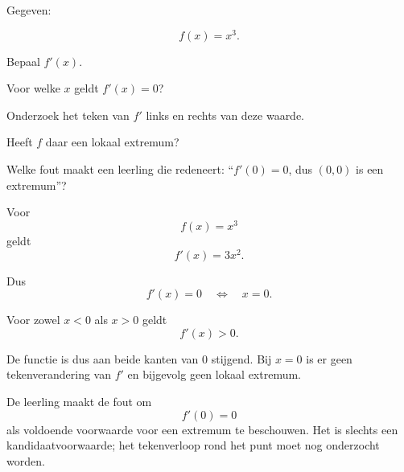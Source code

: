 \documentclass{ximera}
\begin{document}

\begin{oefening}[Geen extremum ondanks $f'(a)=0$]{\oefB\ESS}

Gegeven:

\[
f(x)=x^3.
\]

\begin{question}
Bepaal $f'(x)$.
\end{question}

\begin{question}
Voor welke $x$ geldt $f'(x)=0$?
\end{question}

\begin{question}
Onderzoek het teken van $f'$ links en rechts van deze waarde.
\end{question}

\begin{question}
Heeft $f$ daar een lokaal extremum?
\end{question}

\begin{question}
Welke fout maakt een leerling die redeneert:
``$f'(0)=0$, dus $(0,0)$ is een extremum''?
\end{question}

\begin{oplossing}

Voor
\[
f(x)=x^3
\]
geldt
\[
f'(x)=3x^2.
\]

Dus
\[
f'(x)=0
\quad\Longleftrightarrow\quad
x=0.
\]

Voor zowel $x<0$ als $x>0$ geldt
\[
f'(x)>0.
\]

De functie is dus aan beide kanten van $0$ stijgend. Bij $x=0$ is er geen
tekenverandering van $f'$ en bijgevolg geen lokaal extremum.

De leerling maakt de fout om
\[
f'(0)=0
\]
als voldoende voorwaarde voor een extremum te beschouwen. Het is slechts
een kandidaatvoorwaarde; het tekenverloop rond het punt moet nog onderzocht
worden.

\end{oplossing}

\end{oefening}


\end{document}

